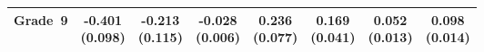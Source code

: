 \begin{tabular}{lccccccc}
Grade~9 & \shortstack{-0.401\\(0.098)} & \shortstack{-0.213\\(0.115)} & \shortstack{-0.028\\(0.006)} & \shortstack{0.236\\(0.077)} & \shortstack{0.169\\(0.041)} & \shortstack{0.052\\(0.013)} & \shortstack{0.098\\(0.014)} \\
\hline \hline 
\end{tabular}